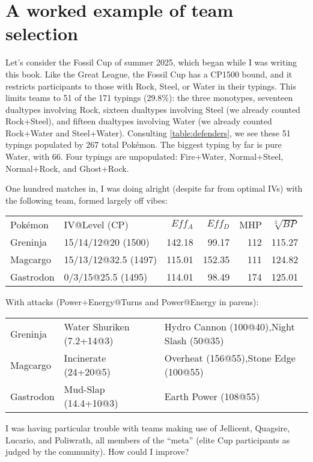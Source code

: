 \chapter{A worked example of team selection}
\label{chap:example}

Let's consider the Fossil Cup of summer 2025, which began while I was writing this book.
Like the Great League, the Fossil Cup has a CP1500 bound, and it
  restricts participants to those with Rock, Steel, or Water in their typings.
This limits teams to 51 of the 171 typings (29.8\%): the three monotypes, seventeen dualtypes
 involving Rock, sixteen dualtypes involving Steel (we already counted Rock+Steel), and
 fifteen dualtypes involving Water (we already counted Rock+Water and Steel+Water).
Consulting \autoref{table:defenders}, we see these 51 typings populated by 267 total Pokémon.
The biggest typing by far is pure Water, with 66.
Four typings are unpopulated: Fire+Water, Normal+Steel, Normal+Rock, and Ghost+Rock.

One hundred matches in, I was doing alright (despite far from optimal IVs)
  with the following team, formed largely off vibes:
\begin{center}
  \begin{tabular}{llrrrr}
    Pokémon & IV@Level (CP) & $Eff_A$ & $Eff_D$ & MHP & $\sqrt[3]{BP}$\\
    \Midrule
    Greninja & 15/14/12@20 (1500) & 142.18 & 99.17 & 112 & 115.27 \\
    Magcargo & 15/13/12@32.5 (1497) & 115.01 & 152.35 & 111 & 124.82 \\
    Gastrodon & 0/3/15@25.5 (1495) & 114.01 & 98.49 & 174 & 125.01 \\
  \end{tabular}
\end{center}
With attacks (Power+Energy@Turns and Power@Energy in parens):
\begin{center}
  \begin{tabular}{llp{}}
    Greninja & Water Shuriken (7.2+14@3) & Hydro Cannon (100@40),\newline Night Slash (50@35)\\
    Magcargo & Incinerate (24+20@5) & Overheat (156@55),\newline Stone Edge (100@55)\\
    Gastrodon & Mud-Slap (14.4+10@3) & Earth Power (108@55)\\
  \end{tabular}
\end{center}
I was having particular trouble with teams making use of Jellicent, Quagsire,
  Lucario, and Poliwrath, all members of the ``meta'' (elite Cup participants
  as judged by the community).
How could I improve?

